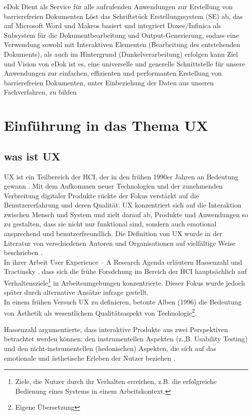 \documentclass[12pt,oneside]{article}
\begin{document}
eDok Dient als Service für alle aufrufenden Anwendungen zur Erstellung von barrierefreien Dokumenten
Löst das Schriftstück Erstellungssystem (SE) ab, das auf Microsoft Word und Makros basiert und integriert Doxee/Infinica als Subsystem für die Dokumentbearbeitung und Output-Generierung, sodass eine Verwendung sowohl mit Interaktiven Elementen (Bearbeitung des entstehenden Dokuments), als auch im Hintergrund (Dunkelverarbeitung) erfolgen kann
Ziel und Vision von eDok ist es, eine universelle und generelle Schnittstelle für unsere Anwendungen zur einfachen, effizienten und performanten Erstellung von barrierefreien Dokumenten, unter Einbeziehung der Daten aus unseren Fachverfahren, zu bilden
\section{Einführung in das Thema UX}
 
\subsection{was ist UX}
UX ist ein Teilbereich der HCI, der in den frühen 1990er Jahren an Bedeutung gewann \cite{glanznig}. Mit dem Aufkommen neuer Technologien und der zunehmenden Verbreitung digitaler Produkte rückte der Fokus verstärkt auf die Benutzererfahrung und deren Qualität. UX konzentriert sich auf die Interaktion zwischen Mensch und System und zielt darauf ab, Produkte und Anwendungen so zu gestalten, dass sie nicht nur funktional sind, sondern auch emotional ansprechend und benutzerfreundlich.
Die Definition von UX  wurde in der Literatur von verschiedenen Autoren und Organisationen auf vielfältige Weise beschrieben \cite{GOISTAI}.\\


In ihrer Arbeit User Experience – A Research Agenda erläutern Hassenzahl und Tractinsky \cite{research}, dass sich die frühe Forsdchung im Bereich der HCI hauptsächlich auf Verhaltensziele\footnote{Ziele, die Nutzer durch ihr Verhalten erreichen, z.B. die erfolgreiche Bedienung eines Systems in einem Arbeitskontext.} in Arbeitsumgebungen konzentrierte. Dieser Fokus wurde jedoch später durch alternative Ansätze infrage gestellt.\\
In einem frühen Versuch  UX zu definieren, betonte Alben (1996) die Bedeutung von Ästhetik als wesentlichem Qualitätsaspekt von Technologie\footnote{Eigene Übersetzung}\cite{research}.

Hassenzahl  argumentierte, dass interaktive Produkte aus zwei Perspektiven betrachtet werden können: den instrumentellen Aspekten (z.,B. Usability Testing) und den nicht-instrumentellen (hedonischen) Aspekten, die sich auf das emotionale und ästhetische Erleben der Nutzer beziehen \cite{hassenzahl2003}.
\end{document}
